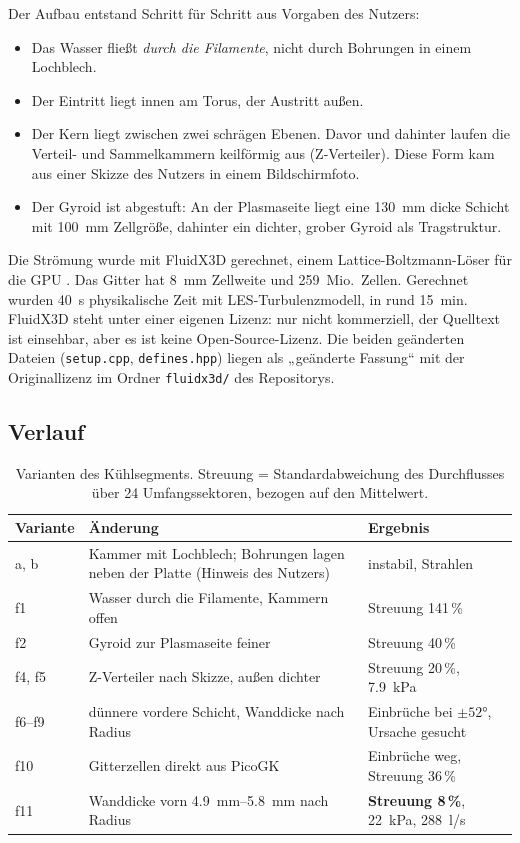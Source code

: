\documentclass[10pt,a4paper]{article}
\begin{document}
Der Aufbau entstand Schritt für Schritt aus Vorgaben des Nutzers:
\begin{itemize}\itemsep1pt
\item Das Wasser fließt \emph{durch die Filamente}, nicht durch Bohrungen in einem Lochblech.
\item Der Eintritt liegt innen am Torus, der Austritt außen.
\item Der Kern liegt zwischen zwei schrägen Ebenen. Davor und dahinter laufen die Verteil- und Sammelkammern
  keilförmig aus (Z-Verteiler). Diese Form kam aus einer Skizze des Nutzers in einem Bildschirmfoto.
\item Der Gyroid ist abgestuft: An der Plasmaseite liegt eine \SI{130}{mm} dicke Schicht mit \SI{100}{mm}
  Zellgröße, dahinter ein dichter, grober Gyroid als Tragstruktur.
\end{itemize}
Die Strömung wurde mit FluidX3D \cite{fluidx3d} gerechnet, einem Lattice-Boltzmann-Löser für die GPU
\cite{lehmann2023,lehmann2022ep,lehmann2022fp,lehmann2022iwocl,lehmann2021,lehmann2019,lehmann2022plic}. Das
Gitter hat \SI{8}{mm} Zellweite und 259~Mio.\ Zellen. Gerechnet wurden \SI{40}{s} physikalische Zeit mit
LES-Turbulenzmodell, in rund \SI{15}{min}. FluidX3D steht unter einer eigenen Lizenz: nur nicht kommerziell,
der Quelltext ist einsehbar, aber es ist keine Open-Source-Lizenz. Die beiden geänderten Dateien
(\texttt{setup.cpp}, \texttt{defines.hpp}) liegen als „geänderte Fassung“ mit der Originallizenz im Ordner
\texttt{fluidx3d/} des Repositorys.

\subsection{Verlauf}
\begin{table}[H]\centering\small
\begin{tabularx}{\linewidth}{@{}lXl@{}}\toprule
Variante & Änderung & Ergebnis \\\midrule
a, b & Kammer mit Lochblech; Bohrungen lagen neben der Platte (Hinweis des Nutzers) & instabil, Strahlen \\
f1 & Wasser durch die Filamente, Kammern offen & Streuung 141\,\% \\
f2 & Gyroid zur Plasmaseite feiner & Streuung 40\,\% \\
f4, f5 & Z-Verteiler nach Skizze, außen dichter & Streuung 20\,\%, \SI{7,9}{kPa} \\
f6--f9 & dünnere vordere Schicht, Wanddicke nach Radius & Einbrüche bei $\pm\ang{52}$, Ursache gesucht \\
f10 & Gitterzellen direkt aus PicoGK & Einbrüche weg, Streuung 36\,\% \\
f11 & Wanddicke vorn \SIrange{4,9}{5,8}{mm} nach Radius & \textbf{Streuung 8\,\%}, \SI{22}{kPa}, \SI{288}{l/s} \\\bottomrule
\end{tabularx}\caption{Varianten des Kühlsegments. Streuung = Standardabweichung des Durchflusses über 24
Umfangssektoren, bezogen auf den Mittelwert.}\end{table}
\end{document}
